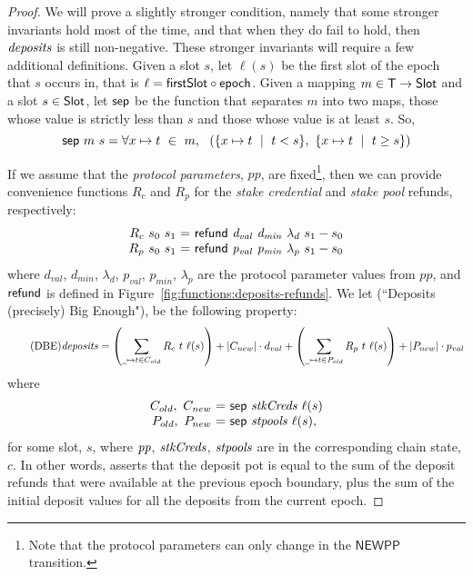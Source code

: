 \begin{proof}

  We will prove a slightly stronger condition, namely that some stronger invariants hold
  most of the time, and that when they do fail to hold, then $\mathit{deposits}$ is still non-negative.
  These stronger invariants will require a few additional definitions.
%
  Given a slot $s$, let $\ell(s)$ be the first slot of the epoch that $s$ occurs in,
  that is $\ell = \mathsf{firstSlot}\circ\mathsf{epoch}$.
  Given a mapping $m\in\mathsf{T}\to\mathsf{Slot}$ and a slot $s\in\mathsf{Slot}$,
  let $\mathsf{sep}$ be the function that separates $m$ into two maps,
  those whose value is strictly less than $s$ and those whose value is at least $s$.
  So,
  \begin{equation*}
    \mathsf{sep}~m~s = \forall x\mapsto t~\in~m,~~
    \left(\{x\mapsto t~\mid~t<s\},~\{x\mapsto t~\mid~t\geq s\}\right)
  \end{equation*}


  \noindent
  If we assume that the \emph{protocol parameters}, $pp$, are fixed\footnote{Note that the
    protocol parameters can only change in the $\mathsf{NEWPP}$ transition.}, then we can provide convenience functions
  $R_c$ and $R_p$ for the \emph{stake credential} and \emph{stake pool} refunds, respectively:
  \begin{equation*}
    \begin{array}{r@{~=~}l}
      R_c~s_0~s_1 & \refund{d_{val}}{d_{min}}{\lambda_d}{s_1-s_0} \\
      R_p~s_0~s_1 & \refund{p_{val}}{p_{min}}{\lambda_p}{s_1-s_0} \\
    \end{array}
  \end{equation*}
  where $d_{val}$, $d_{min}$, $\lambda_d$, $p_{val}$, $p_{min}$, $\lambda_p$
  are the protocol parameter values from $pp$, and $\mathsf{refund}$ is defined in
  Figure~\ref{fig:functions:deposits-refunds}.
  We let  (``Deposits (precisely) Big Enough"), be the following property:
  \begin{equation}\tag{DBE}\label{DBE}
    \var{deposits}
    = \left(\sum_{\wcard\mapsto t\in C_{old}}R_c~t~\ell(s)\right)
    + |C_{new}|\cdot d_{val}
    + \left(\sum_{\wcard\mapsto t\in P_{old}}R_p~t~\ell(s)\right)
    + |P_{new}|\cdot p_{val}
  \end{equation}
  where
  \begin{equation*}
    \begin{array}{r@{~=~}l}
      C_{old},~C_{new} & \fun{sep}~\var{stkCreds}~{\ell(s)} \\
      P_{old},~P_{new} & \fun{sep}~\var{stpools}~{\ell(s)},
    \end{array}
  \end{equation*}
  for some slot, $s$, where $\mathit{pp}$, $\mathit{stkCreds}$, $\mathit{stpools}$ are in the corresponding chain state, $c$.
%
  In other words,  asserts that the deposit pot is equal to the
  sum of the deposit refunds that were available at the previous epoch boundary,
  plus the sum of the initial deposit values for all the deposits from the current epoch.


\end{proof}
